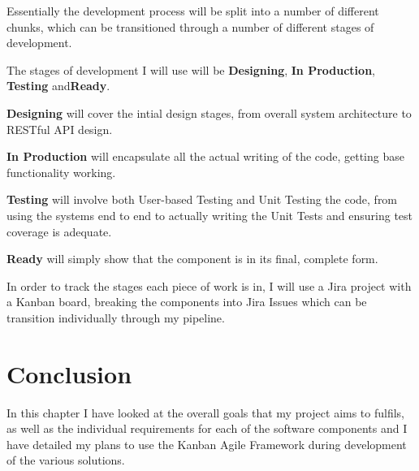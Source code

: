 Essentially the development process will be split into a number of different chunks, which can be transitioned through a number of different stages of development.

The stages of development I will use will be \textbf{Designing}, \textbf{In Production}, \textbf{Testing} and\textbf{Ready}.

\textbf{Designing} will cover the intial design stages, from overall system architecture to RESTful API design.

\textbf{In Production} will encapsulate all the actual writing of the code, getting base functionality working.

\textbf{Testing} will involve both User-based Testing and Unit Testing the code, from using the systems end to end to actually writing the Unit Tests and ensuring test coverage is adequate.

\textbf{Ready} will simply show that the component is in its final, complete form.

In order to track the stages each piece of work is in, I will use a Jira project with a Kanban board, breaking the components into Jira Issues which can be transition individually through my pipeline.

\section{Conclusion}
In this chapter I have looked at the overall goals that my project aims to fulfils, as well as the individual requirements for each of the software components and I have detailed my plans to use the Kanban Agile Framework during development of the various solutions.